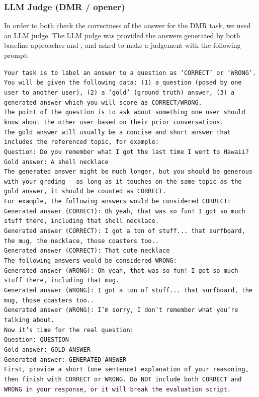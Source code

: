 \subsubsection{LLM Judge (DMR / opener)}
In order to both check the correctness of the answer for the DMR task, we used an LLM judge. The LLM judge was provided the answers generated by both baseline approaches and \ours, and asked to make a judgement with the following prompt: 
\begin{mdframed}
\small
\texttt{Your task is to label an answer to a question as 'CORRECT' or 'WRONG'.\\
You will be given the following data: (1) a question (posed by one user to another user), (2) a 'gold' (ground truth) answer, (3) a generated answer which you will score as CORRECT/WRONG.\\
The point of the question is to ask about something one user should know about the other user based on their prior conversations.\\
The gold answer will usually be a concise and short answer that includes the referenced topic, for example:\\
Question: Do you remember what I got the last time I went to Hawaii?\\
Gold answer: A shell necklace\\
The generated answer might be much longer, but you should be generous with your grading - as long as it touches on the same topic as the gold answer, it should be counted as CORRECT.\\
For example, the following answers would be considered CORRECT:\\
Generated answer (CORRECT): Oh yeah, that was so fun! I got so much stuff there, including that shell necklace.\\
Generated answer (CORRECT): I got a ton of stuff... that surfboard, the mug, the necklace, those coasters too..\\
Generated answer (CORRECT): That cute necklace\\
The following answers would be considered WRONG:\\
Generated answer (WRONG): Oh yeah, that was so fun! I got so much stuff there, including that mug.\\
Generated answer (WRONG): I got a ton of stuff... that surfboard, the mug, those coasters too..\\
Generated answer (WRONG): I'm sorry, I don't remember what you're talking about.\\
Now it's time for the real question:\\
Question: QUESTION\\
Gold answer: GOLD\_ANSWER\\
Generated answer: GENERATED\_ANSWER\\
First, provide a short (one sentence) explanation of your reasoning, then finish with CORRECT or WRONG. Do NOT include both CORRECT and WRONG in your response, or it will break the evaluation script.}
\end{mdframed}

